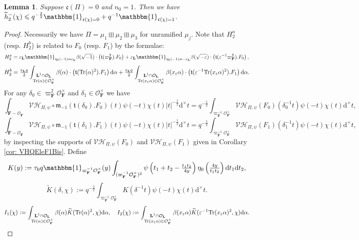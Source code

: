 \documentclass[A4]{amsart}
\def\leq{\leqslant}
\newtheorem{lemma}      [theorem]{Lemma}
\numberwithin{equation}{section} \everymath{\displaystyle}
\newcommand{\Tr}{{\rm Tr}}
\newcommand{\id}{\mathbbm{1}}
\newcommand{\ud}{\mathrm{d}}
\newcommand{\F}{\mathbf{F}}
\newcommand{\bL}{\mathbf{L}}
\newcommand{\vO}{\mathcal{O}}
\newcommand{\norm}[1][\cdot]{\lvert #1 \rvert}
\newcommand{\Mult}{\mathfrak{m}}
\newcommand{\VorH}{\mathcal{VH}}
\newcommand{\Trans}{\mathfrak{t}}
\newcommand{\cond}{\mathfrak{c}}
\begin{document}
\begin{lemma} \label{lem: h2-Bdn0=1}
	Suppose $\cond(\Pi)=0$ and $n_0=1$. Then we have $\widetilde{h}_2^-(\chi) \leq q^{-\frac{3}{2}} \id_{\cond(\chi)=0} + q^{-1} \id_{\cond(\chi)=1}$.
\end{lemma}
\begin{proof}
	Necessarily we have $\Pi = \mu_1 \boxplus \mu_2 \boxplus \mu_3$ for unramified $\mu_j$. Note that $H_2^a$ (resp. $H_2^b$) is related to $F_0$ (resp. $F_1$) by the formulae:
	$$ H_2^a = \varepsilon_{\bL} \id_{\eta_0(-1)=\varepsilon_{\bL}} \beta(\sqrt{-1}) \cdot \left( \Trans(\varpi_{\F}^2).F_0 \right) + \varepsilon_{\bL} \id_{\eta_0(-1)=-\varepsilon_{\bL}} \beta(\sqrt{-\varepsilon}) \cdot \left( \Trans(\varepsilon^{-1}\varpi_{\F}^2).F_0 \right), $$
	$$ H_2^b = \tfrac{\varepsilon_{\bL}q}{2} \int_{\substack{\bL^1 \cap \vO_{\bL} \\ \Tr(\alpha) \in \vO_{\F}^{\times}}} \beta(\alpha) \cdot \left( \Trans(\Tr(\alpha)^2).F_1 \right) \ud \alpha + \tfrac{\varepsilon_{\bL}q}{2} \int_{\substack{\bL^1 \cap \vO_{\bL} \\ \Tr(x_{\varepsilon} \alpha) \in \vO_{\F}^{\times}}} \beta(x_{\varepsilon} \alpha) \cdot \left( \Trans(\varepsilon^{-1} \Tr(x_{\varepsilon} \alpha)^2).F_1 \right) \ud \alpha. $$
	For any $\delta_0 \in \varpi_{\F}^2 \vO_{\F}^{\times}$ and $\delta_1 \in \vO_{\F}^{\times}$ we have
	$$ \int_{\F-\vO_{\F}} \VorH_{\Pi,\psi} \circ \Mult_{-1} \left( \Trans(\delta_0).F_0 \right)(t) \psi(-t)\chi(t)\norm[t]^{-\frac{1}{2}} \ud^{\times}t = q^{-\frac{5}{2}} \int_{\varpi_{\F}^{-1}\vO_{\F}^{\times}} \VorH_{\Pi,\psi}(F_0)(\delta_0^{-1}t) \psi(-t)\chi(t) \ud^{\times}t, $$
	$$ \int_{\F-\vO_{\F}} \VorH_{\Pi,\psi} \circ \Mult_{-1} \left( \Trans(\delta_1).F_1 \right)(t) \psi(-t)\chi(t)\norm[t]^{-\frac{1}{2}} \ud^{\times}t = q^{-\frac{5}{2}} \int_{\varpi_{\F}^{-1}\vO_{\F}^{\times}} \VorH_{\Pi,\psi}(F_1)(\delta_1^{-1}t) \psi(-t)\chi(t) \ud^{\times}t, $$
by inspecting the supports of $\VorH_{\Pi,\psi}(F_0)$ and $\VorH_{\Pi,\psi}(F_1)$ given in Corollary \ref{cor: VHQEleF1Bis}. Define
	$$ K(y) := \tau_0 q \id_{\varpi_{\F}^{-1} \vO_{\F}^{\times}}(y) \int_{(\varpi_{\F}^{-1}\vO_{\F}^{\times})^2} \psi \left( t_1+t_2 - \tfrac{t_1t_2}{4y} \right) \eta_0 \left( \tfrac{4y}{t_1t_2} \right) \ud t_1 \ud t_2,  $$
	$$ \widetilde{K}(\delta, \chi) := q^{-\frac{5}{2}} \int_{\varpi_{\F}^{-1}\vO_{\F}^{\times}} K(\delta^{-1}t) \psi(-t)\chi(t) \ud^{\times}t. $$
	$$ I_1(\chi) := \int_{\substack{\bL^1 \cap \vO_{\bL} \\ \Tr(\alpha) \in \vO_{\F}^{\times}}} \beta(\alpha) \widetilde{K}(\Tr(\alpha)^2,\chi) \ud \alpha, \quad I_2(\chi) := \int_{\substack{\bL^1 \cap \vO_{\bL} \\ \Tr(x_{\varepsilon} \alpha) \in \vO_{\F}^{\times}}} \beta(x_{\varepsilon} \alpha) \widetilde{K}(\varepsilon^{-1} \Tr(x_{\varepsilon} \alpha)^2,\chi) \ud \alpha. $$

\end{proof}
\end{document}
